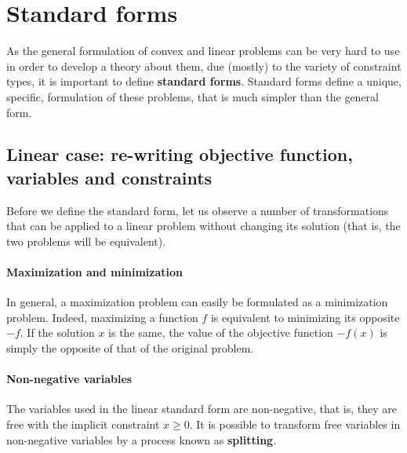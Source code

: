 \section{Standard forms}
As the general formulation of convex and linear problems can be very hard to use in order to develop a theory about them, due (mostly) to the variety of constraint types, it is important to define \textbf{standard forms}. Standard forms define a unique, specific, formulation of these problems, that is much simpler than the general form.

\subsection{Linear case: re-writing objective function, variables and constraints}
Before we define the standard form, let us observe a number of transformations that can be applied to a linear problem without changing its solution (that is, the two problems will be equivalent).

\paragraph{Maximization and minimization}
In general, a maximization problem can easily be formulated as a minimization problem. Indeed, maximizing a function $f$ is equivalent to minimizing its opposite $-f$. If the solution $x$ is the same, the value of the objective function $-f(x)$ is simply the opposite of that of the original problem.

\begin{center}
\end{center}

\paragraph{Non-negative variables}
The variables used in the linear standard form are non-negative, that is, they are free with the implicit constraint $x \geq 0$. It is possible to transform free variables in non-negative variables by a process known as \textbf{splitting}.

